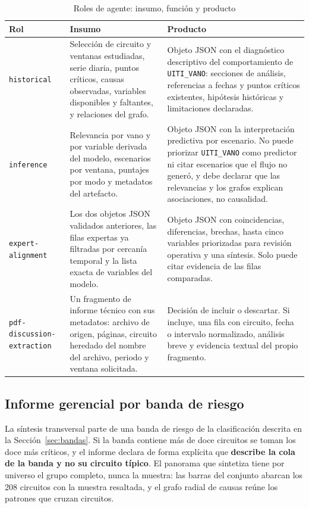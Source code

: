\documentclass[11pt,a4paper]{article}
\begin{document}
\begin{table}[H]
\centering
\caption{Roles de agente: insumo, función y producto}
\label{tab:agentes}
\footnotesize
\begin{tabularx}{\textwidth}{L{3.4cm} L{3.6cm} X}
\toprule
\textbf{Rol} & \textbf{Insumo} & \textbf{Producto} \\
\midrule
\texttt{historical} &
Selección de circuito y ventanas estudiadas, serie diaria, puntos críticos, causas observadas, variables
disponibles y faltantes, y relaciones del grafo. &
Objeto JSON con el diagnóstico descriptivo del comportamiento de \texttt{UITI\_VANO}:
secciones de análisis, referencias a fechas y puntos críticos existentes, hipótesis históricas y
limitaciones declaradas. \\
\addlinespace
\texttt{inference} &
Relevancia por vano y por variable derivada del modelo, escenarios por ventana, puntajes por
modo y metadatos del artefacto. &
Objeto JSON con la interpretación predictiva por escenario. No puede priorizar
\texttt{UITI\_VANO} como predictor ni citar escenarios que el flujo no generó, y debe declarar
que las relevancias y los grafos explican asociaciones, no causalidad. \\
\addlinespace
\texttt{expert-alignment} &
Los dos objetos JSON validados anteriores, las filas expertas ya filtradas por cercanía
temporal y la lista exacta de variables del modelo. &
Objeto JSON con coincidencias, diferencias, brechas, hasta cinco variables priorizadas para
revisión operativa y una síntesis. Solo puede citar evidencia de las filas comparadas. \\
\addlinespace
\texttt{pdf-discussion-} \texttt{extraction} &
Un fragmento de informe técnico con sus metadatos: archivo de origen, páginas, circuito
heredado del nombre del archivo, periodo y ventana solicitada. &
Decisión de incluir o descartar. Si incluye, una fila con circuito, fecha o intervalo
normalizado, análisis breve y evidencia textual del propio fragmento. \\
\bottomrule
\end{tabularx}
\end{table}

\subsection{Informe gerencial por banda de riesgo}

La síntesis transversal parte de una banda de riesgo de la clasificación descrita en la
Sección~\ref{sec:bandas}. Si la banda contiene más de doce circuitos se toman los doce más
críticos, y el informe declara de forma explícita que \textbf{describe la cola de la banda y no
su circuito típico}. El panorama que sintetiza tiene por universo el grupo completo, nunca la
muestra: las barras del conjunto abarcan los 208 circuitos con la muestra resaltada, y el grafo
radial de causas reúne los patrones que cruzan circuitos.
\end{document}
